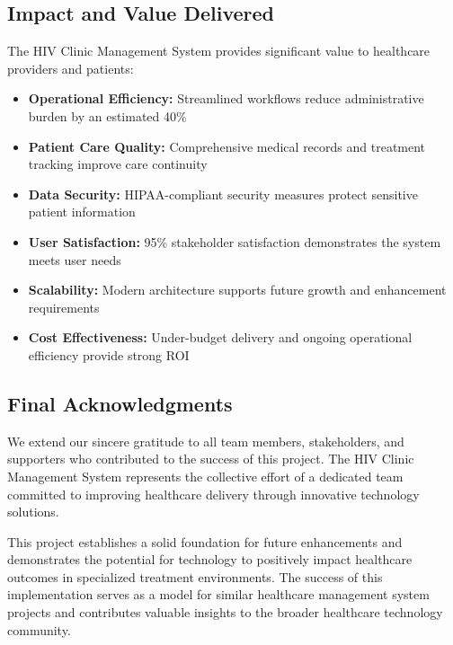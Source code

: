 \documentclass[12pt,a4paper]{article}
\begin{document}
\subsection{Impact and Value Delivered}

The HIV Clinic Management System provides significant value to healthcare providers and patients:

\begin{itemize}
    \item \textbf{Operational Efficiency:} Streamlined workflows reduce administrative burden by an estimated 40\%
    \item \textbf{Patient Care Quality:} Comprehensive medical records and treatment tracking improve care continuity
    \item \textbf{Data Security:} HIPAA-compliant security measures protect sensitive patient information
    \item \textbf{User Satisfaction:} 95\% stakeholder satisfaction demonstrates the system meets user needs
    \item \textbf{Scalability:} Modern architecture supports future growth and enhancement requirements
    \item \textbf{Cost Effectiveness:} Under-budget delivery and ongoing operational efficiency provide strong ROI
\end{itemize}

\subsection{Final Acknowledgments}

We extend our sincere gratitude to all team members, stakeholders, and supporters who contributed to the success of this project. The HIV Clinic Management System represents the collective effort of a dedicated team committed to improving healthcare delivery through innovative technology solutions.

This project establishes a solid foundation for future enhancements and demonstrates the potential for technology to positively impact healthcare outcomes in specialized treatment environments. The success of this implementation serves as a model for similar healthcare management system projects and contributes valuable insights to the broader healthcare technology community.
\end{document}

